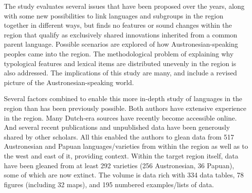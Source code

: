The study evaluates several issues that have been proposed over the years,
along with some new possibilities to link languages
and subgroups in the region together in different ways,
but finds no features or sound changes within the region that qualify as exclusively
shared innovations inherited from a common parent language.
Possible scenarios are explored of how Austronesian-speaking peoples came into the region.
The methodological problem of explaining why typological features
and lexical items are distributed unevenly in the region is also addressed.
The implications of this study are many,
and include a revised picture of the Austronesian-speaking world.

Several factors combined to enable this more in-depth study
of languages in the region than has been previously possible.
Both authors have extensive experience in the region.
Many Dutch-era sources have recently become accessible online.
And several recent publications
and unpublished data have been generously shared by other scholars.
All this enabled the authors to glean data
from 517 Austronesian
and Papuan languages/varieties from within
the region as well as to the west and east of it,
providing context.
Within the target region itself,
data have been gleaned from at least 292 varieties
(256 Austronesian, 36 Papuan),
some of which are now extinct.
The volume is data rich with 334 data tables,
78 figures (including 32 maps),
and 195 numbered examples/lists of data.
